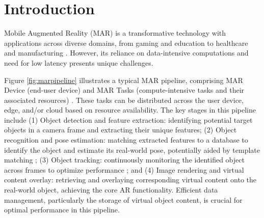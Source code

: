\section{Introduction}
\label{sec:intro}
    Mobile Augmented Reality (MAR) \cite{bib:arsurvey1} is a transformative technology with applications across diverse domains, from gaming \cite{bib:pgorest} and education \cite{bib:eduar} to healthcare \cite{bib:healthar} and manufacturing \cite{bib:manuf}. However, its reliance on data-intensive computations and need for low latency presents unique challenges.
    

    Figure \ref{fig:marpipeline} illustrates a typical MAR pipeline, comprising MAR Device (end-user device) and MAR Tasks (compute-intensive tasks and their associated resources) \cite{bib:marpipeline}. These tasks can be distributed across the user device, edge, and/or cloud based on resource availability. The key stages in this pipeline include (1) Object detection and feature extraction: identifying potential target objects in a camera frame and extracting their unique features; (2) Object recognition and pose estimation: matching extracted features to a database to identify the object and estimate its real-world pose, potentially aided by template matching \cite{bib:tempmatch}; (3) Object tracking: continuously monitoring the identified object across frames to optimize performance \cite{bib:objtrack}; and (4) Image rendering and virtual content overlay: retrieving and overlaying corresponding virtual content onto the real-world object, achieving the core AR functionality. Efficient data management, particularly the storage of virtual object content, is crucial for optimal performance in this pipeline.
    
